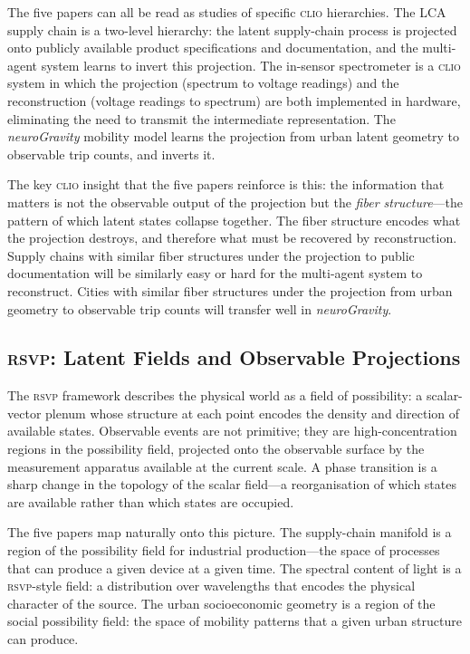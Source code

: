 \documentclass[12pt, letterpaper]{article}
\theoremstyle{remark}
\newcommand{\rsvp}{\textsc{rsvp}}
\newcommand{\clio}{\textsc{clio}}
\newcommand{\neuro}{\textit{neuroGravity}}
\begin{document}
The five papers can all be read as studies of specific \clio{} hierarchies.
The LCA supply chain is a two-level hierarchy: the latent supply-chain
process is projected onto publicly available product specifications and
documentation, and the multi-agent system learns to invert this projection.
The in-sensor spectrometer is a \clio{} system in which the projection
(spectrum to voltage readings) and the reconstruction (voltage readings to
spectrum) are both implemented in hardware, eliminating the need to transmit
the intermediate representation.  The \neuro{} mobility model learns the
projection from urban latent geometry to observable trip counts, and
inverts it.

The key \clio{} insight that the five papers reinforce is this: the
information that matters is not the observable output of the projection
but the \emph{fiber structure}---the pattern of which latent states collapse
together.  The fiber structure encodes what the projection destroys, and
therefore what must be recovered by reconstruction.  Supply chains with
similar fiber structures under the projection to public documentation will
be similarly easy or hard for the multi-agent system to reconstruct.  Cities
with similar fiber structures under the projection from urban geometry to
observable trip counts will transfer well in \neuro{}.

\subsection{\rsvp{}: Latent Fields and Observable Projections}

The \rsvp{} framework describes the physical world as a field of possibility:
a scalar-vector plenum whose structure at each point encodes the density and
direction of available states.  Observable events are not primitive; they
are high-concentration regions in the possibility field, projected onto the
observable surface by the measurement apparatus available at the current
scale.  A phase transition is a sharp change in the topology of the scalar
field---a reorganisation of which states are available rather than which
states are occupied.

The five papers map naturally onto this picture.  The supply-chain manifold
is a region of the possibility field for industrial production---the space
of processes that can produce a given device at a given time.  The spectral
content of light is a \rsvp{}-style field: a distribution over wavelengths
that encodes the physical character of the source.  The urban socioeconomic
geometry is a region of the social possibility field: the space of mobility
patterns that a given urban structure can produce.
\end{document}
